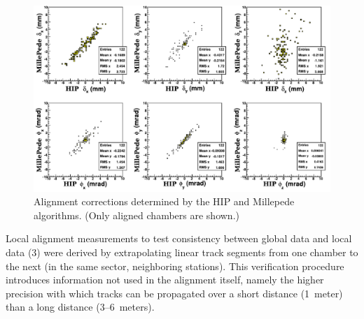 \begin{figure}
\begin{center}


\includegraphics[width=\linewidth]{plots/gma_hip_results/MP-V4_vs_HIP-V4.pdf}
\end{center}
\caption{Alignment corrections determined by the HIP and Millepede algorithms. (Only aligned chambers are shown.)\label{fig:sidebyside}}
\end{figure}

Local alignment measurements to test consistency between global data
and local data (3) were derived by extrapolating linear track segments
from one chamber to the next (in the same sector, neighboring
stations).  This verification procedure introduces information not
used in the alignment itself, namely the higher precision with which
tracks can be propagated over a short distance (1~meter) than a long
distance (3--6~meters).

